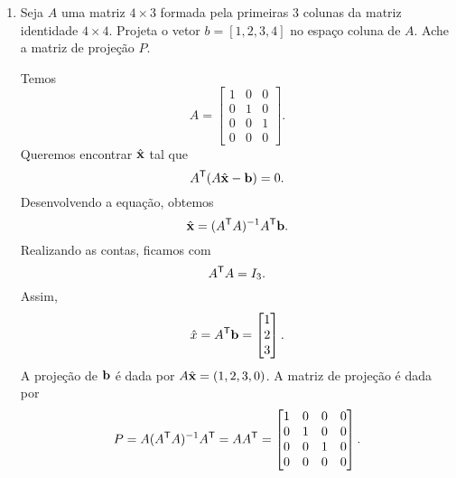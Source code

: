 \documentclass[leqno]{article}
\begin{document}
\begin{enumerate}

\item Seja $A$ uma matriz $4 \times 3$ formada pela primeiras 3 colunas da matriz identidade $4 \times 4$. Projeta o vetor $b = [1,2,3,4]$ no espaço coluna de $A$. Ache a matriz de projeção $P$.

\begin{sol} 

    Temos
    \begin{equation*}
        A =
        \begin{bmatrix}
            1 & 0 & 0 \\
            0 & 1 & 0 \\
            0 & 0 & 1 \\
            0 & 0 & 0
        \end{bmatrix}
    .\end{equation*}
    Queremos encontrar \( \hat{ \mathbf{x} } \) tal que
    \begin{equation*}
        A^{ \mathsf{T} } ( A \hat{ \mathbf{x} } - \mathbf{b} ) = 0
    .\end{equation*}
    Desenvolvendo a equação, obtemos
    \begin{equation*}
        \hat{ \mathbf{x} } = ( A^{ \mathsf{T} } A )^{ -1 } A^{ \mathsf{T} } \mathbf{b}
    .\end{equation*}
    Realizando as contas, ficamos com
    \begin{equation*}
        A^{ \mathsf{T} }A = I_{ 3 }
    .\end{equation*}
    Assim,
    \begin{equation*}
        \hat{ x } = A^{ \mathsf{T} } \mathbf{b} =
        \begin{bmatrix}
            1 \\
            2 \\
            3
        \end{bmatrix}
    .\end{equation*}
    A projeção de \( \mathbf{b} \) é dada por \( A \hat{ \mathbf{x} } = ( 1, 2, 3, 0 ) \).
    A matriz de projeção é dada por
    \begin{equation*}
        P = A ( A^{ \mathsf{T} } A )^{ -1 } A^{ \mathsf{T} } = A A^{ \mathsf{T} } =
        \begin{bmatrix}
            1 & 0 & 0 & 0 \\
            0 & 1 & 0 & 0 \\
            0 & 0 & 1 & 0 \\
            0 & 0 & 0 & 0
        \end{bmatrix}
    .\end{equation*}
\end{sol} 



\end{enumerate}
\end{document}
